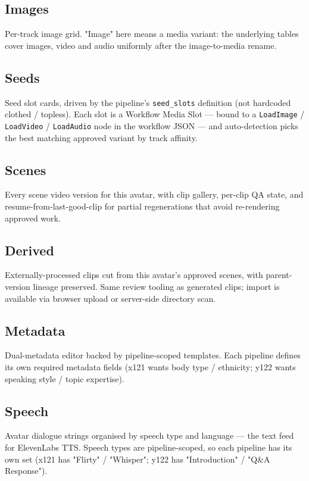 \subsection{Images}
Per-track image grid. "Image" here means a media variant: the underlying
tables cover images, video and audio uniformly after the image-to-media
rename.

\subsection{Seeds}
Seed slot cards, driven by the pipeline's \texttt{seed\_slots} definition (not
hardcoded clothed / topless). Each slot is a Workflow Media Slot — bound to a
\texttt{LoadImage} / \texttt{LoadVideo} / \texttt{LoadAudio} node in the workflow
JSON — and auto-detection picks the best matching approved variant by track
affinity.

\subsection{Scenes}
Every scene video version for this avatar, with clip gallery, per-clip QA
state, and resume-from-last-good-clip for partial regenerations that avoid
re-rendering approved work.

\subsection{Derived}
Externally-processed clips cut from this avatar's approved scenes, with parent-
version lineage preserved. Same review tooling as generated clips; import is
available via browser upload or server-side directory scan.

\subsection{Metadata}
Dual-metadata editor backed by pipeline-scoped templates. Each pipeline defines
its own required metadata fields (x121 wants body type / ethnicity;
y122 wants speaking style / topic expertise).

\subsection{Speech}
Avatar dialogue strings organised by speech type and language — the text feed
for ElevenLabs TTS. Speech types are pipeline-scoped, so each pipeline has its
own set (x121 has "Flirty" / "Whisper"; y122 has "Introduction" / "Q\&A Response").


